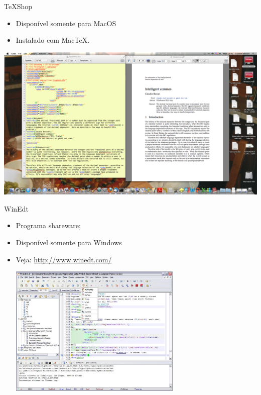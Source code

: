 \begin{frame}{TeXShop}
\begin{itemize}
\item Disponível somente para MacOS
\item Instalado com Mac\TeX.
\end{itemize}

\centering
\includegraphics[width=\textwidth,height=.7\textheight,keepaspectratio]{img/TeXShopPNG.png}
\end{frame}

\begin{frame}{WinEdt}
\begin{itemize}
\item Programa shareware;
\item Disponível somente para Windows
\item Veja: \url{http://www.winedt.com/}

\centering\includegraphics[width=0.65\textwidth]{img/WinEdt.pdf}
\end{itemize}
\end{frame}

